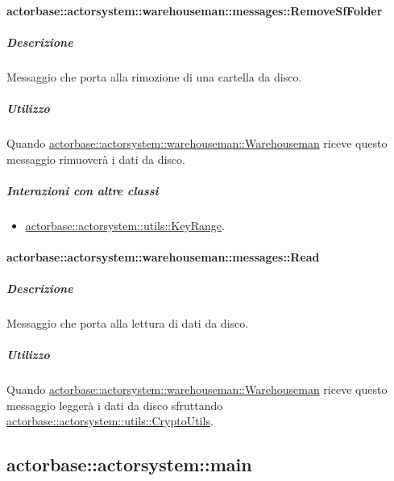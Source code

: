 \documentclass{scalatekids-article}
\begin{document}
\paragraph{actorbase::actorsystem::warehouseman::messages::RemoveSfFolder}
\label{sec:actorbase::actorsystem::warehouseman::messages::RemoveSfFolder}

\subparagraph{Descrizione}

Messaggio che porta alla rimozione di una cartella da disco.

\subparagraph{Utilizzo}

Quando \hyperref[sec:actorbase::actorsystem::warehouseman::Warehouseman]{actorbase::actorsystem::warehouseman::Warehouseman}
riceve questo messaggio rimuoverà i dati da disco.

\subparagraph{Interazioni con altre classi}
\begin{itemize}
\item \hyperref[sec:actorbase::actorsystem::utils::KeyRange]{actorbase::actorsystem::utils::KeyRange}.
\end{itemize}

\paragraph{actorbase::actorsystem::warehouseman::messages::Read}
\label{sec:actorbase::actorsystem::warehouseman::messages::Read}

\subparagraph{Descrizione}

Messaggio che porta alla lettura di dati da disco.

\subparagraph{Utilizzo}

Quando \hyperref[sec:actorbase::actorsystem::warehouseman::Warehouseman]{actorbase::actorsystem::warehouseman::Warehouseman}
riceve questo messaggio leggerà i dati da disco sfruttando
\hyperref[sec:actorbase::actorsystem::utils::CryptoUtils]{actorbase::actorsystem::utils::CryptoUtils}.


\subsection{actorbase::actorsystem::main} %
\label{sec:actorbase::actorsystem::main}
\end{document}
